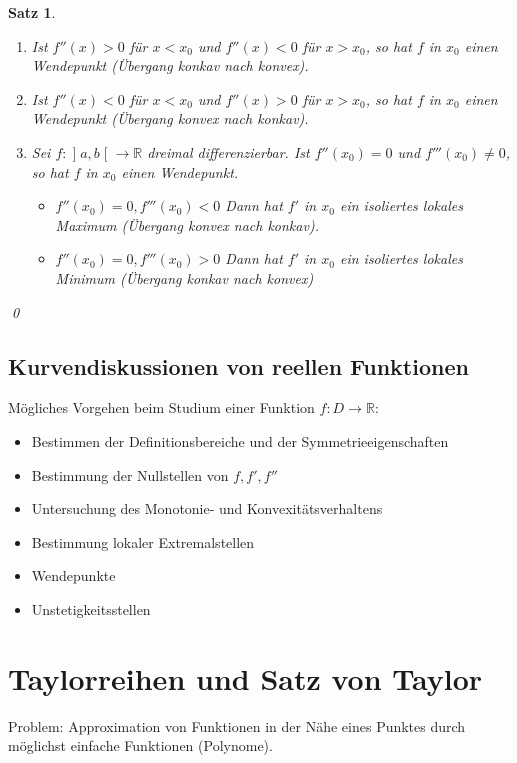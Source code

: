 \documentclass[ngerman,titlepage,twoside, parskip=half*]{scrreprt}
\newcommand*{\R}{\mathbb{R}}
\theoremstyle{break}
\newtheorem{theorem}{Satz}[section]
\theoremstyle{nonumberbreak}
\newcommand*{\bsofint}[1]{\mathopen{]}#1\mathclose{[}} %
\begin{document}
\begin{theorem}
\begin{enumerate}[(i)]
      \begin{enumerate}[(1)]
	\item Ist $f''(x)>0$ für $x<x_0$ und $f''(x)<0$ für $x>x_0$, so
	  hat $f$ in $x_0$ einen Wendepunkt (Übergang konkav nach konvex).
	\item Ist $f''(x)<0$ für $x<x_0$ und $f''(x)>0$ für $x>x_0$, so
	  hat $f$ in  $x_0$ einen Wendepunkt (Übergang konvex nach konkav).
	\item Sei $f\colon\bsofint{a,b}\rightarrow\R$ dreimal differenzierbar. Ist
	  $f''(x_0)=0$ und $f'''(x_0)\neq 0$, so hat $f$ in $x_0$
	  einen Wendepunkt.
	  \begin{itemize}
	    \item $f''(x_0)=0, f'''(x_0)<0$ Dann hat $f'$ in $x_0$ ein
	      isoliertes lokales Maximum (Übergang konvex nach konkav).
	    \item $f''(x_0)=0, f'''(x_0)>0$ Dann hat $f'$ in $x_0$ ein
	      isoliertes lokales Minimum (Übergang konkav nach konvex)
	  \end{itemize}
      \end{enumerate}
  \end{enumerate}
  \qed
\end{theorem}

\subsection{Kurvendiskussionen von reellen Funktionen}
Mögliches Vorgehen beim Studium einer Funktion $f\colon D\rightarrow\R$:
\begin{itemize}
  \item Bestimmen der Definitionsbereiche und der Symmetrieeigenschaften
  \item Bestimmung der Nullstellen von $f, f', f''$
  \item Untersuchung des Monotonie- und Konvexitätsverhaltens
  \item Bestimmung lokaler Extremalstellen
  \item Wendepunkte
  \item Unstetigkeitsstellen
\end{itemize}

\section{Taylorreihen und Satz von Taylor}
Problem: Approximation von Funktionen in der Nähe eines Punktes durch
möglichst einfache Funktionen (Polynome).
\end{document}
